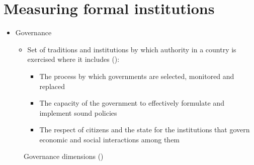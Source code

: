 \documentclass[
  ignorenonframetext,
]{beamer}
\providecommand{\tightlist}{%
  \setlength{\itemsep}{0pt}\setlength{\parskip}{0pt}}\usepackage{longtable,booktabs,array}
\begin{document}
\section{Measuring formal
institutions}\label{measuring-formal-institutions}

\begin{frame}{}
\label{section-3}
\begin{itemize}
\item
  Governance

  \begin{itemize}
  \item
    Set of traditions and institutions by which authority in a country
    is exercised where it includes
    ():

    \begin{itemize}
    \tightlist
    \item
      The process by which governments are selected, monitored and
      replaced
    \item
      The capacity of the government to effectively formulate and
      implement sound policies
    \item
      The respect of citizens and the state for the institutions that
      govern economic and social interactions among them
    \end{itemize}
  \end{itemize}
\end{itemize}
\end{frame}

\begin{frame}{}
\label{section-4}
\begin{figure}


\caption{\label{fig-governance-indicators}Governance dimensions
()}

\end{figure}%
\end{frame}
\end{document}
